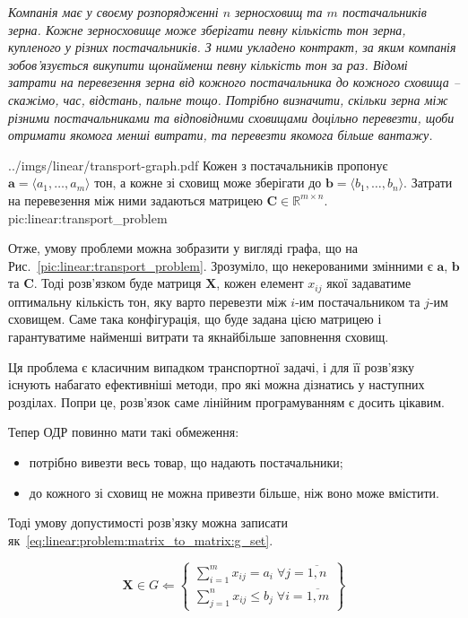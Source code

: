 \documentclass[\main/book.tex]{subfiles}
\begin{document}
\textit{Компанія має у своєму розпорядженні $n$ зерносховищ та $m$ постачальників зерна. Кожне зерносховище може зберігати певну кількість тон зерна, купленого у різних постачальників. З ними укладено контракт, за яким компанія зобов'язується викупити щонайменш певну кількість тон за раз. Відомі затрати на перевезення зерна від кожного постачальника до кожного сховища -- скажімо, час, відстань, пальне тощо. Потрібно визначити, скільки зерна між різними постачальниками та відповідними сховищами доцільно перевезти, щоби отримати якомога менші витрати, та перевезти якомога більше вантажу.}

\illustration
 {../imgs/linear/transport-graph.pdf}
 {Кожен з постачальників пропонує $\mathbf{a} = {\langle a_1, \ldots, a_m \rangle}$ тон, а кожне зі сховищ може зберігати до $\mathbf{b} = {\langle b_1, \ldots, b_n \rangle}$. Затрати на перевезення між ними задаються матрицею $\mathbf{C} \in \mathbb{R}^{m \times n}$.}
 {pic:linear:transport_problem}

Отже, умову проблеми можна зобразити у вигляді графа, що на Рис.~\ref{pic:linear:transport_problem}. Зрозуміло, що некерованими змінними є $\mathbf{a}$, $\mathbf{b}$ та $\mathbf{C}$. Тоді розв'язком буде матриця $\mathbf{X}$, кожен елемент $x_{ij}$ якої задаватиме \flqq{}оптимальну\frqq{} кількість тон, яку варто перевезти між $i$-им постачальником та $j$-им сховищем. Саме така конфігурація, що буде задана цією матрицею і гарантуватиме найменші витрати та якнайбільше заповнення сховищ.

\begin{note}
 Ця проблема є класичним випадком транспортної задачі, і для її розв'язку існують набагато ефективніші методи, про які можна дізнатись у наступних розділах. Попри це, розв'язок саме лінійним програмуванням є досить цікавим.
\end{note}

Тепер ОДР повинно мати такі обмеження:

\begin{itemize}
 \item потрібно вивезти весь товар, що надають постачальники;
 \item до кожного зі сховищ не можна привезти більше, ніж воно може вмістити.
\end{itemize}

Тоді умову допустимості розв'язку можна записати як~\ref{eq:linear:problem:matrix_to_matrix:g_set}.

\begin{equation}
 \mathbf{X} \in G \Leftarrow \left\{
 \begin{array}{l}
  \displaystyle
  \sum_{i=1}^m x_{ij} = a_i\; \forall j = \overline{1, n} \\
  \displaystyle
  \sum_{j=1}^n x_{ij} \leq b_j\; \forall i = \overline{1, m}
 \end{array}
 \right\}
 \label{eq:linear:problem:matrix_to_matrix:g_set}
\end{equation}
\end{document}
